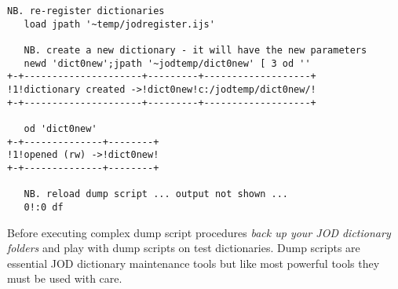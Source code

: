 \begin{enumerate}
\begin{tcolorbox}[breakable, size=fbox, boxrule=1pt, pad at break*=1mm,colback=cellbackground, colframe=cellborder]
\begin{lstlisting}[language=jdoc, frame=single,framerule=0pt,label=lst:scr5077X4]
   NB. re-register dictionaries   
   load jpath '~temp/jodregister.ijs'

   NB. create a new dictionary - it will have the new parameters   
   newd 'dict0new';jpath '~jodtemp/dict0new' [ 3 od ''
+-+---------------------+---------+-------------------+
!1!dictionary created ->!dict0new!c:/jodtemp/dict0new/!
+-+---------------------+---------+-------------------+

   od 'dict0new'
+-+--------------+--------+
!1!opened (rw) ->!dict0new!
+-+--------------+--------+

   NB. reload dump script ... output not shown ...   
   0!:0 df  
\end{lstlisting}
\end{tcolorbox}

  Before executing complex dump script procedures \emph{back up your JOD
  dictionary folders} and play with dump scripts on test dictionaries.
  Dump scripts are essential JOD dictionary maintenance tools but like
  most powerful tools they must be used with care.
  
\end{enumerate}
%
%


%